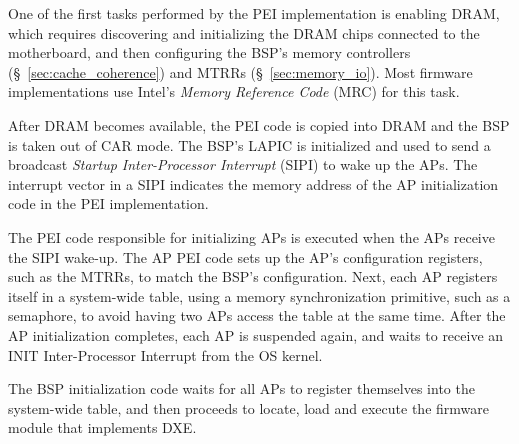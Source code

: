 One of the first tasks performed by the PEI implementation is enabling DRAM,
which requires discovering and initializing the DRAM chips connected to the
motherboard, and then configuring the BSP's memory controllers
(\S~\ref{sec:cache_coherence}) and MTRRs (\S~\ref{sec:memory_io}). Most
firmware implementations use Intel's \textit{Memory Reference Code} (MRC) for
this task.

After DRAM becomes available, the PEI code is copied into DRAM and the BSP is
taken out of CAR mode. The BSP's LAPIC is initialized and used to send a
broadcast \textit{Startup Inter-Processor Interrupt} (SIPI) to wake up the
APs. The interrupt vector in a SIPI indicates the memory address of the AP
initialization code in the PEI implementation.


The PEI code responsible for initializing APs is executed when the APs receive
the SIPI wake-up. The AP PEI code sets up the AP's configuration registers,
such as the MTRRs, to match the BSP's configuration. Next, each AP registers
itself in a system-wide table, using a memory synchronization primitive, such
as a semaphore, to avoid having two APs access the table at the same time.
After the AP initialization completes, each AP is suspended again,
and waits to receive an INIT Inter-Processor Interrupt from the OS kernel.

The BSP initialization code waits for all APs to register themselves into the
system-wide table, and then proceeds to locate, load and execute the firmware
module that implements DXE.
